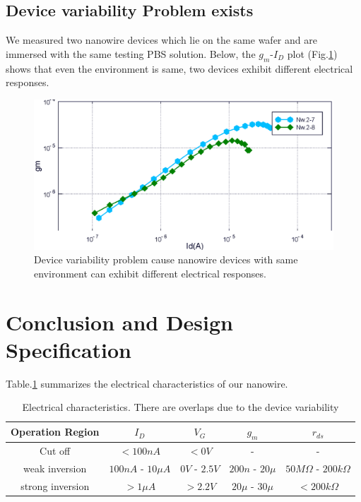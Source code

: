 \subsection{Device variability Problem exists}
We measured two nanowire devices which lie on the same wafer and are immersed with the same testing PBS solution.
Below, the $g_m$-$I_D$ plot (Fig.\ref{fig:disparity}) shows that even the environment is same, two devices exhibit different electrical responses.

\begin{figure}[!htbp]
    \centering
    \def\svgwidth{width=0.67\textwidth}
    \includegraphics[width=1\textwidth] {images/chapter3/pDisparity.eps}
    \caption{Device variability problem cause nanowire devices with same environment can exhibit different electrical responses.}
    \label{fig:disparity}
\end{figure}


\FloatBarrier

\section{Conclusion and Design Specification} \label{sec:spec3}

Table.\ref{tb:NWcharacter} summarizes the electrical characteristics of our nanowire.
\begin{table}[h!bp]
    {\fontfamily{}\fontsize{10}{14}\selectfont
    \centering
    \begin{tabular}{c|c|c|c|c}
        Operation Region & $I_D$ & $V_G$ & $g_m$ & $r_{ds}$ \\
        \hline
        Cut off & $< 100n A$ & $< 0 V$ & - & - \\
        weak inversion & $100n A$ - $10\mu A$ & $0 V$ - $2.5V$ & $200n $ - $20\mu$ & $50M\Omega$ - $200k\Omega$ \\
        strong inversion & $> 1\mu A$ & $> 2.2V$ & $20\mu$ - $30\mu$ & $< 200k\Omega $ \\
    \end{tabular}
    \caption{Electrical characteristics. There are overlaps due to the device variability}
    \label{tb:NWcharacter}
    }
\end{table}

